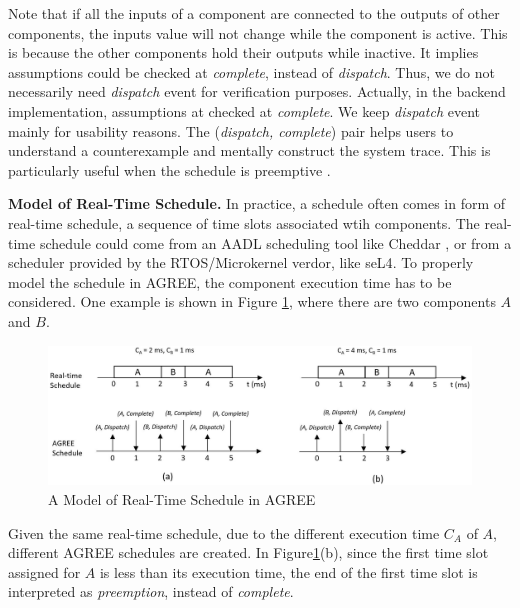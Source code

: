 Note that if all the inputs of a component are connected to the outputs of other components, the inputs value will not change while the component is active. This is because the other components hold their outputs while inactive. It implies assumptions could be checked at \emph{complete}, instead of \emph{dispatch}. Thus, we do not necessarily need \emph{dispatch} event for verification purposes. Actually, in the backend implementation, assumptions at checked at \emph{complete}. We keep \emph{dispatch} event mainly for usability reasons. The (\emph{dispatch, complete}) pair helps users to understand a counterexample and mentally construct the system trace. This is particularly useful when the schedule is preemptive .

{\bf Model of Real-Time Schedule.}
In practice, a schedule often comes in form of real-time schedule, a sequence of time slots associated wtih components. The real-time schedule could come from an AADL scheduling tool like Cheddar \cite{Cheddar}, or from a scheduler provided by the RTOS/Microkernel verdor, like seL4\cite{seL4}. To properly model the schedule in AGREE, the component execution time has to be considered. One example is shown in Figure \ref{RTschedule}, where there are two components $A$ and $B$. 
\begin{figure}[ht!]
\centering
\includegraphics[width=130mm]{RTschedule.jpg}
\caption{A Model of Real-Time Schedule in AGREE\label{RTschedule}}
\end{figure}
Given the same real-time schedule, due to the different execution time $C_A$ of $A$, different AGREE schedules are created. In Figure\ref{RTschedule}(b), since the first time slot assigned for $A$ is less than its execution time, the end of the first time slot is interpreted as \emph{preemption}, instead of \emph{complete}.

